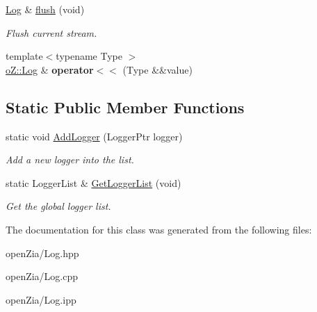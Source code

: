 \begin{DoxyCompactItemize}
\mbox{\label{classo_z_1_1_log_a41c8972eca682eb2701126b43a2f9099}} 
\mbox{\hyperlink{classo_z_1_1_log}{Log}} \& \mbox{\hyperlink{classo_z_1_1_log_a41c8972eca682eb2701126b43a2f9099}{flush}} (void)
\begin{DoxyCompactList}\small\item\em Flush current stream. \end{DoxyCompactList}\item 
\mbox{\label{classo_z_1_1_log_ab4b6199f686c0b32f40be8885fca9db0}} 
{\footnotesize template$<$typename Type $>$ }\\\mbox{\hyperlink{classo_z_1_1_log}{o\+Z\+::\+Log}} \& {\bfseries operator$<$$<$} (Type \&\&value)
\end{DoxyCompactItemize}
\subsection*{Static Public Member Functions}
\begin{DoxyCompactItemize}
\item 
\mbox{\label{classo_z_1_1_log_a09f81a16467abe5e5f38d4caf9d9e738}} 
static void \mbox{\hyperlink{classo_z_1_1_log_a09f81a16467abe5e5f38d4caf9d9e738}{Add\+Logger}} (Logger\+Ptr logger)
\begin{DoxyCompactList}\small\item\em Add a new logger into the list. \end{DoxyCompactList}\item 
\mbox{\label{classo_z_1_1_log_aa1c737e66220f5f6f2f557c054b44e48}} 
static Logger\+List \& \mbox{\hyperlink{classo_z_1_1_log_aa1c737e66220f5f6f2f557c054b44e48}{Get\+Logger\+List}} (void)
\begin{DoxyCompactList}\small\item\em Get the global logger list. \end{DoxyCompactList}\end{DoxyCompactItemize}


The documentation for this class was generated from the following files\+:\begin{DoxyCompactItemize}
\item 
open\+Zia/Log.\+hpp\item 
open\+Zia/Log.\+cpp\item 
open\+Zia/Log.\+ipp\end{DoxyCompactItemize}
